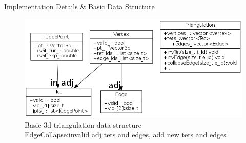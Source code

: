 \documentclass{beamer}
\begin{document}
\begin{frame} {Implementation Details \& Basic Data Structure}
  \begin{figure}
    \centering
    \includegraphics[width=\textwidth] {basic_dt}
    \caption[basic\_dt]{Basic 3d triangulation data structure\\ EdgeCollapse:invalid adj tets and edges, add new tets and edges}
  \end{figure}
\end{frame}
\end{document}
